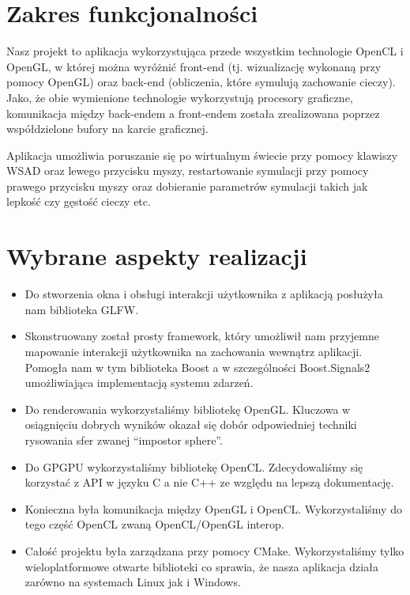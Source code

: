 \documentclass[polish, 12pt]{aghthesis}
\begin{document}
\section{Zakres funkcjonalności}

	Nasz projekt to aplikacja wykorzystująca przede wszystkim technologie OpenCL i OpenGL, w której można wyróżnić front-end (tj. wizualizację wykonaną przy pomocy OpenGL) oraz back-end (obliczenia, które symulują zachowanie cieczy). Jako, że obie wymienione technologie wykorzystują procesory graficzne, komunikacja między back-endem a front-endem została zrealizowana poprzez współdzielone bufory na karcie graficznej. 

	Aplikacja umożliwia poruszanie się po wirtualnym świecie przy pomocy klawiszy WSAD oraz lewego przycisku myszy, restartowanie symulacji przy pomocy prawego przycisku myszy oraz dobieranie parametrów symulacji takich jak lepkość czy gęstość cieczy etc.

\section{Wybrane aspekty realizacji}

	\begin{itemize}
		\item Do stworzenia okna i obsługi interakcji użytkownika z aplikacją posłużyła nam biblioteka GLFW.
		\item Skonstruowany został prosty framework, który umożliwił nam przyjemne mapowanie interakcji użytkownika na zachowania wewnątrz aplikacji. Pomogła nam w tym biblioteka Boost a w szczególności Boost.Signals2 umożliwiająca implementacją systemu zdarzeń.
		\item Do renderowania wykorzystaliśmy bibliotekę OpenGL. Kluczowa w osiągnięciu dobrych wyników okazał się dobór odpowiedniej techniki rysowania sfer zwanej “impostor sphere”.
		\item Do GPGPU wykorzystaliśmy bibliotekę OpenCL. Zdecydowaliśmy się korzystać z API w języku C a nie C++ ze względu na lepszą dokumentację.
		\item Konieczna była komunikacja między OpenGL i OpenCL. Wykorzystaliśmy do tego część OpenCL zwaną OpenCL/OpenGL interop.
		\item Całość projektu była zarządzana przy pomocy CMake. Wykorzystaliśmy tylko wieloplatformowe otwarte biblioteki co sprawia, że nasza aplikacja działa zarówno na systemach Linux jak i Windows.
	\end{itemize}
	
\end{document}

